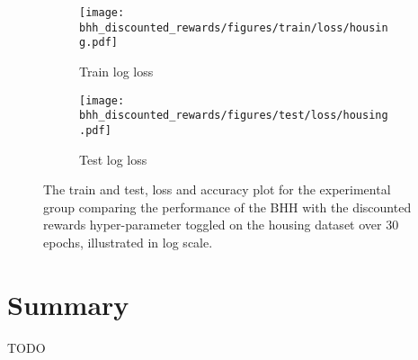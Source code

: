 \begin{figure}[H]
	\begin{subfigure}{0.5\textwidth}
		\centering
		\texttt{[image: bhh\_discounted\_rewards/figures/train/loss/housing.pdf]}
		\caption{Train log loss}
		\label{fig:results:discounted_rewards:figures:loss:train:housing}
	\end{subfigure}
	\begin{subfigure}{0.5\textwidth}
		\centering
		\texttt{[image: bhh\_discounted\_rewards/figures/test/loss/housing.pdf]}
		\caption{Test log loss}
		\label{fig:results:discounted_rewards:figures:loss:test:housing}
	\end{subfigure}
	\par\bigskip
	\caption{The train and test, loss and accuracy plot for the experimental group comparing the performance of the \acs{BHH} with the discounted rewards hyper-parameter toggled on the housing dataset over 30 epochs, illustrated in log scale.}
	\label{fig:results:discounted_rewards:figures:housing}
\end{figure}

\section{Summary}\label{sec:results:summary}

TODO